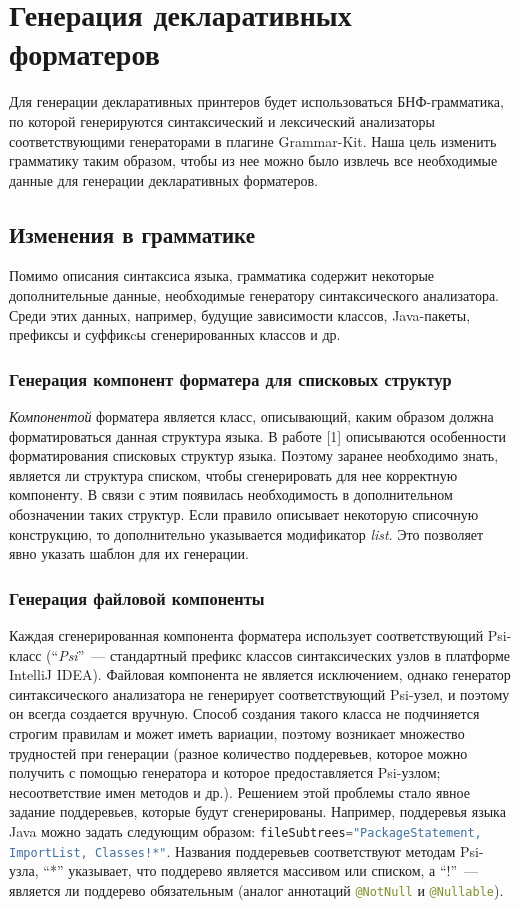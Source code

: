 \documentclass[conference]{IEEEtran}
\begin{document}
\section{Генерация декларативных форматеров}
Для генерации декларативных принтеров будет использоваться БНФ-грамматика, по которой генерируются синтаксический и лексический анализаторы соответствующими генераторами в плагине Grammar-Kit.
Наша цель изменить грамматику таким образом, чтобы из нее можно было извлечь все необходимые данные для генерации декларативных форматеров.
\subsection{Изменения в грамматике}
Помимо описания синтаксиса языка, грамматика содержит некоторые дополнительные данные, необходимые генератору синтаксического анализатора.
Среди этих данных, например, будущие зависимости классов, Java-пакеты, префиксы и суффикcы сгенерированных классов и др.

\subsubsection*{Генерация компонент форматера для списковых структур}
\emph{Компонентой} форматера является класс, описывающий, каким образом должна форматироваться данная структура языка.
В работе [1] %
описываются особенности форматирования списковых структур языка.
Поэтому заранее необходимо знать, является ли структура списком, чтобы сгенерировать для нее корректную компоненту.
В связи с этим появилась необходимость в дополнительном обозначении таких структур.
Если правило описывает некоторую списочную конструкцию, то дополнительно указывается модификатор \emph{list}.
Это позволяет явно указать шаблон для их генерации.

\subsubsection*{Генерация файловой компоненты}
Каждая сгенерированная компонента форматера использует соответствующий Psi-класс (``\emph{Psi}''~--- стандартный префикс классов синтаксических узлов в платформе IntelliJ IDEA).
Файловая компонента не является исключением, однако генератор синтаксического анализатора не генерирует соответствующий Psi-узел, и поэтому он всегда создается вручную.
Способ создания такого класса не подчиняется строгим правилам и может иметь вариации, поэтому возникает множество трудностей при генерации (разное количество поддеревьев, которое можно получить с помощью генератора и которое предоставляется Psi-узлом; несоответствие имен методов и др.).
Решением этой проблемы стало явное задание поддеревьев, которые будут сгенерированы.
Например, поддеревья языка Java можно задать следующим образом: \lstinline[language=java]{fileSubtrees="PackageStatement, ImportList, Classes!*"}.
Названия поддеревьев соответствуют методам Psi-узла, ``*'' указывает, что поддерево является массивом или списком, а ``!''~--- является ли поддерево обязательным (аналог аннотаций \lstinline[language=java]{@NotNull} и \lstinline[language=java]{@Nullable}).
\end{document}
